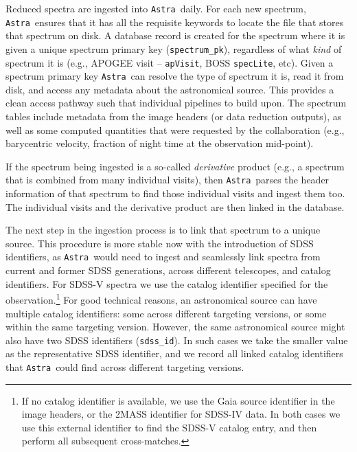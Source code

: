 \documentclass[modern]{aastex631}
\newcommand{\astra}{\texttt{Astra}}
\newcommand{\Astra}{\astra}
\begin{document}
Reduced spectra are ingested into \Astra\ daily. For each new spectrum, \Astra\ ensures that it has all the requisite keywords to locate the file that stores that spectrum on disk. A database record is created for the spectrum where it is given a unique spectrum primary key (\texttt{spectrum\_pk}), regardless of what \emph{kind} of spectrum it is (e.g., APOGEE visit -- \texttt{apVisit}, BOSS \texttt{specLite}, etc). Given a spectrum primary key \Astra\ can resolve the type of spectrum it is, read it from disk, and access any metadata about the astronomical source. This provides a clean access pathway such that individual pipelines to build upon. The spectrum tables include  metadata from the image headers (or data reduction outputs), as well as some computed quantities that were requested by the collaboration (e.g., barycentric velocity, fraction of night time at the observation mid-point). 

If the spectrum being ingested is a so-called \emph{derivative} product (e.g., a spectrum that is combined from many individual visits), then \Astra\ parses the header information of that spectrum to find those individual visits and ingest them too. The individual visits and the derivative product are then linked in the database.

The next step in the ingestion process is to link that spectrum to a unique source. This procedure is more stable now with the introduction of SDSS identifiers, as \Astra\ would need to ingest and seamlessly link spectra from current and former SDSS generations, across different telescopes, and catalog identifiers.
For SDSS-V spectra we use the catalog identifier specified for the observation.\footnote{If no catalog identifier is available, we use the Gaia source identifier in the image headers, or the 2MASS identifier for SDSS-IV data. In both cases we use this external identifier to find the SDSS-V catalog entry, and then perform all subsequent cross-matches.} For good technical reasons, an astronomical source can have multiple catalog identifiers: some across different targeting versions, or some within the same targeting version. However, the same astronomical source might also have two SDSS identifiers (\texttt{sdss\_id}). In such cases we take the smaller value as the representative SDSS identifier, and we record all linked catalog identifiers that \Astra\ could find across different targeting versions.
\end{document}
